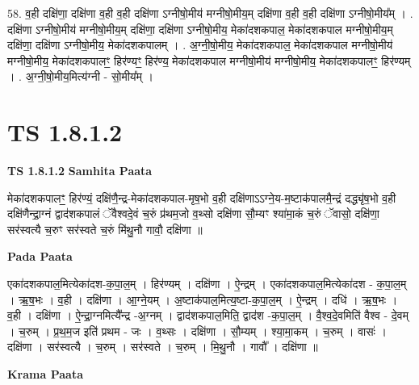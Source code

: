 \documentclass[17pt]{extarticle}
\begin{document}
58. व॒ही दक्षि॑णा॒ दक्षि॑णा व॒ही व॒ही दक्षि॑णा ऽग्नीषो॒मीय॑ मग्नीषो॒मीय॒म् दक्षि॑णा व॒ही व॒ही 
दक्षि॑णा ऽग्नीषो॒मीय᳚म् । . दक्षि॑णा ऽग्नीषो॒मीय॑ मग्नीषो॒मीय॒म् दक्षि॑णा॒ दक्षि॑णा ऽग्नीषो॒मीय॒ मेका॑दशकपाल॒ मेका॑दशकपाल मग्नीषो॒मीय॒म् दक्षि॑णा॒ दक्षि॑णा ऽग्नीषो॒मीय॒ मेका॑दशकपालम् । . अ॒ग्नी॒षो॒मीय॒ मेका॑दशकपाल॒ मेका॑दशकपाल मग्नीषो॒मीय॑ मग्नीषो॒मीय॒ मेका॑दशकपालꣳ॒॒ हिर॑ण्यꣳ॒॒ हिर॑ण्य॒ मेका॑दशकपाल मग्नीषो॒मीय॑ मग्नीषो॒मीय॒ मेका॑दशकपालꣳ॒॒ हिर॑ण्यम् । . अ॒ग्नी॒षो॒मीय॒मित्य॑ग्नी - सो॒मीय᳚म् । \newline
\pagebreak
{}

\section{ TS 1.8.1.2 }

\textbf{TS 1.8.1.2 } \newline
\textbf{Samhita Paata} \newline

मेका॑दशकपालꣳ॒॒ हिर॑ण्यं॒ दक्षि॑णै॒न्द्र-मेका॑दशकपाल-मृष॒भो व॒ही दक्षि॑णाऽऽग्ने॒य-म॒ष्टाक॑पालमै॒न्द्रं दद्ध्यृ॑ष॒भो व॒ही दक्षि॑णैन्द्रा॒ग्नं द्वाद॑शकपालं ॅवैश्वदे॒वं च॒रुं प्र॑थम॒जो व॒थ्सो दक्षि॑णा सौ॒म्यꣳ श्या॑मा॒कं च॒रुं ॅवासो॒ दक्षि॑णा॒ सर॑स्वत्यै च॒रुꣳ सर॑स्वते च॒रुं मि॑थु॒नौ गावौ॒ दक्षि॑णा ॥ \newline

\textbf{Pada Paata} \newline

एका॑दशकपाल॒मित्येका॑दश-क॒पा॒ल॒म् । हिर॑ण्यम् । दक्षि॑णा । ऐ॒न्द्रम् । एका॑दशकपाल॒मित्येका॑दश - क॒पा॒ल॒म् । ऋ॒ष॒भः । व॒ही । दक्षि॑णा । आ॒ग्ने॒यम् । अ॒ष्टाक॑पाल॒मित्य॒ष्टा-क॒पा॒ल॒म् । ऐ॒न्द्रम् । दधि॑ । ऋ॒ष॒भः । व॒ही । दक्षि॑णा । ऐ॒न्द्रा॒ग्नमित्यै᳚न्द्र -अ॒ग्नम् । द्वाद॑शकपाल॒मिति॒ द्वाद॑श -क॒पा॒ल॒म् । वै॒श्व॒दे॒वमिति॑ वैश्व - दे॒वम् । च॒रुम् । प्र॒थ॒म॒ज इति॑ प्रथम - जः । व॒थ्सः । दक्षि॑णा । सौ॒म्यम् । श्या॒मा॒कम् । च॒रुम् । वासः॑ । दक्षि॑णा । सर॑स्वत्यै । च॒रुम् । सर॑स्वते । च॒रुम् । मि॒थु॒नौ । गावौ᳚ । दक्षि॑णा ॥  \newline


\textbf{Krama Paata} \newline
\end{document}
